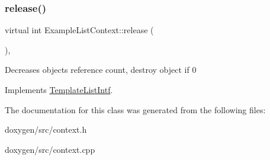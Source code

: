 \mbox{\label{class_example_list_context_a16f04119a9b9f8d728637e149791d708}} 
\subsubsection{\texorpdfstring{release()}{release()}}
{\footnotesize\ttfamily virtual int Example\+List\+Context\+::release (\begin{DoxyParamCaption}{ }\end{DoxyParamCaption})\hspace{0.3cm}{\ttfamily [inline]}, {\ttfamily [virtual]}}

Decreases object\textquotesingle{}s reference count, destroy object if 0 

Implements \mbox{\hyperlink{class_template_list_intf_a0c53169c740c09dac47efc62bbe39674}{Template\+List\+Intf}}.



The documentation for this class was generated from the following files\+:\begin{DoxyCompactItemize}
\item 
doxygen/src/context.\+h\item 
doxygen/src/context.\+cpp\end{DoxyCompactItemize}
